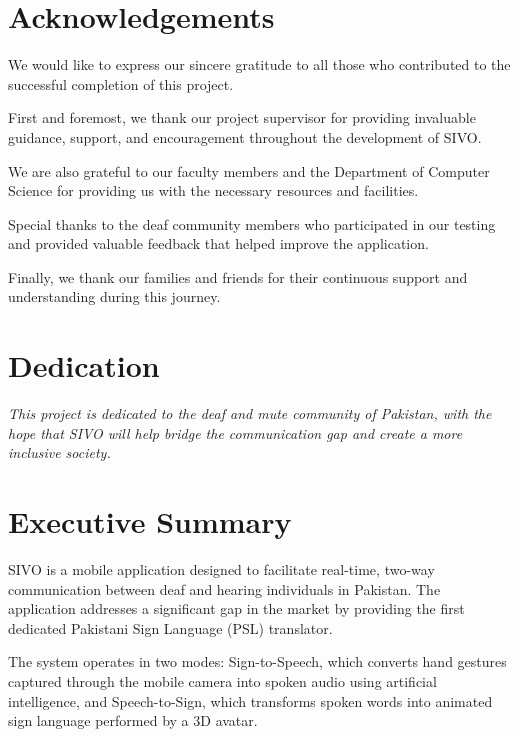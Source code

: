 \documentclass[12pt,a4paper,oneside]{report}
\begin{document}
\chapter*{Acknowledgements}

We would like to express our sincere gratitude to all those who contributed to the successful completion of this project.

First and foremost, we thank our project supervisor for providing invaluable guidance, support, and encouragement throughout the development of SIVO.

We are also grateful to our faculty members and the Department of Computer Science for providing us with the necessary resources and facilities.

Special thanks to the deaf community members who participated in our testing and provided valuable feedback that helped improve the application.

Finally, we thank our families and friends for their continuous support and understanding during this journey.

\chapter*{Dedication}

\textit{This project is dedicated to the deaf and mute community of Pakistan, with the hope that SIVO will help bridge the communication gap and create a more inclusive society.}

\chapter*{Executive Summary}

SIVO is a mobile application designed to facilitate real-time, two-way communication between deaf and hearing individuals in Pakistan. The application addresses a significant gap in the market by providing the first dedicated Pakistani Sign Language (PSL) translator.

The system operates in two modes: Sign-to-Speech, which converts hand gestures captured through the mobile camera into spoken audio using artificial intelligence, and Speech-to-Sign, which transforms spoken words into animated sign language performed by a 3D avatar.
\end{document}
